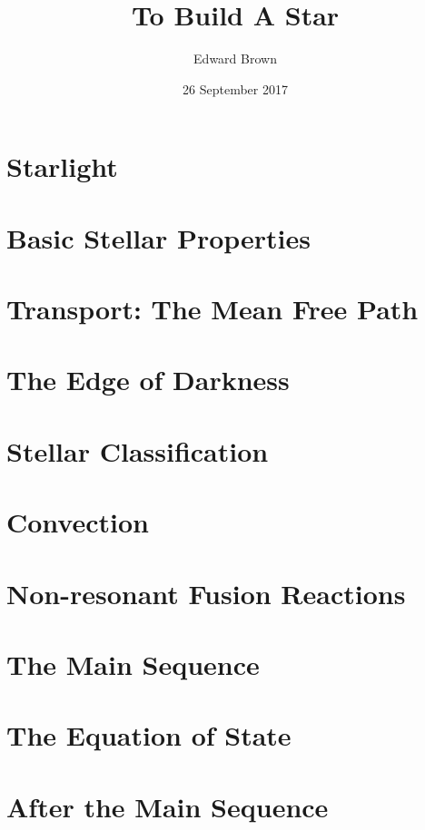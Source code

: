 \documentclass[profonts,stix,symmetric]{astro-bookshelf}
\title{To Build A Star}
\author{Edward Brown}
\date{26 September 2017}
\begin{document}
\frontmatter
{}


\mainmatter
{}
\setcounter{page}{1}

\chapter{Starlight}\label{ch.starlight}


\chapter{Basic Stellar Properties}\label{ch.basic-stellar-properties}


\chapter{Transport: The Mean Free Path}\label{ch.mean-free-path}


\chapter{The Edge of Darkness}\label{ch.stellar-atmospheres}


\chapter{Stellar Classification}\label{ch.classifying-stars}


\chapter{Convection}\label{ch.convection}


\chapter{Non-resonant Fusion Reactions}\label{ch.nuclear-burning}


\chapter{The Main Sequence}\label{ch.main-sequence}


\chapter{The Equation of State}\label{ch.degeneracy}


\chapter{After the Main Sequence}\label{ch.post-main-sequence}



\backmatter


\end{document}
